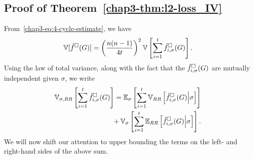 \subsection{Proof of Theorem~\ref{chap3-thm:l2-loss_IV}}
\label{chap3-sub:l2-loss_IV_proof}
From~\eqref{chap3-eq:4-cycle-estimate}, we have
\begin{align*}
  \operatorname{\mathbb{V}}[\hat{f}^\square(G)] = \left(\frac{n(n-1)}{4t}\right)^2 \operatorname{\mathbb{V}}\left[\sum_{i=1}^t
  \hat{f}_{i,\sigma}^\square(G)\right].
\end{align*}
Using the law of total variance, along with the fact that the
$\hat{f}_{i,\sigma}^\square(G)$ are mutually independent given $\sigma$, we write
\begin{align}
  \operatorname{\mathbb{V}}_{\sigma, RR}\left[\sum_{i=1}^t \hat{f}_{i,\sigma}^\square(G)\right] = \operatorname{\mathbb{E}}_\sigma\left[\sum_{i=1}^t
    \operatorname{\mathbb{V}}_{RR}\left[\hat{f}_{i,\sigma}^\square(G) \middle| \sigma\right]\right] \label{chap3-eq:4-cycle-ev}\\
    + \operatorname{\mathbb{V}}_\sigma\left[ \sum_{i=1}^t
    \operatorname{\mathbb{E}}_{RR}\left[\hat{f}_{i,\sigma}^\square(G)\middle| \sigma
    \right]\right]. \label{chap3-eq:4-cycle-ve}
\end{align}
We will now shift our attention to upper bounding the terms on the left- and right-hand sides of the above sum.

